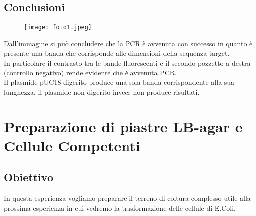 \documentclass{extarticle}
\begin{document}
\subsection*{Conclusioni}
\begin{minipage}{0.5\textwidth}
    \begin{figure}[H]
        \texttt{[image: foto1.jpeg]}
    \end{figure}
    \end{minipage} \hfill
    \begin{minipage}{0.45\textwidth}
    Dall'immagine si può concludere che la PCR è
    avvenuta con successo in quanto è presente una
    banda che corrisponde alle dimensioni della
    sequenza target.\\
    In particolare il contrasto tra le
    bande fluorescenti e il secondo pozzetto
    a destra (controllo negativo) rende evidente che è avvenuta PCR.\\
    Il plasmide pUC18 digerito produce una sola banda corrispondente alla sua lunghezza, il plasmide non digerito invece non produce risultati.
\end{minipage}

\newpage
\section{Preparazione di piastre LB-agar e Cellule Competenti}
\subsection*{Obiettivo} In questa esperienza vogliamo preparare il terreno di coltura complesso utile alla prossima esperienza in cui vedremo la trasformazione delle cellule di E.Coli.
\end{document}
